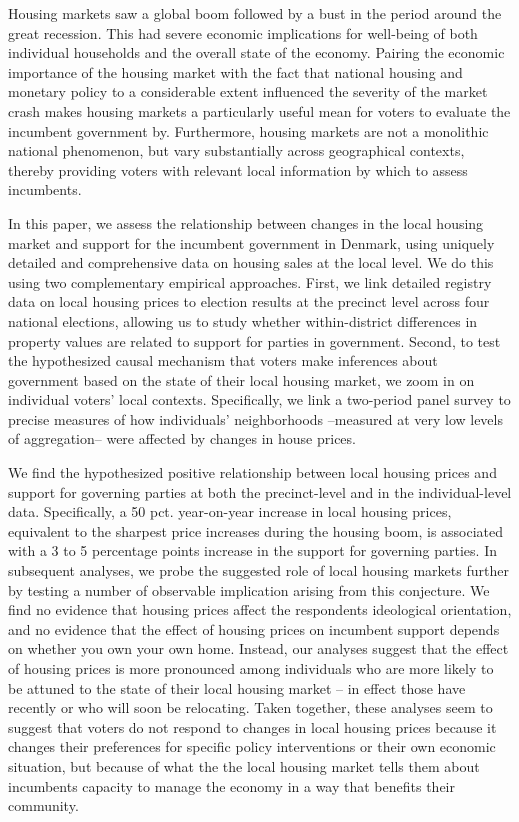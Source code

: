 \documentclass[12pt,a4paper]{article}
\begin{document}
Housing markets saw a global boom followed by a bust in the period around the great recession. This had severe economic implications for well-being of both individual households and the overall state of the economy. Pairing the economic importance of the housing market with the fact that national housing and monetary policy to a considerable extent influenced the severity of the market crash makes housing markets a particularly useful mean for voters to evaluate the incumbent government by. Furthermore, housing markets are not a monolithic national phenomenon, but vary substantially across geographical contexts, thereby providing voters with relevant local information by which to assess incumbents. 

In this paper, we assess the relationship between changes in the local housing market and support for the incumbent government in Denmark, using uniquely detailed and comprehensive data on housing sales at the local level. We do this using two complementary empirical approaches. First, we link detailed registry data on local housing prices to election results at the precinct level across four national elections, allowing us to study whether within-district differences in property values are related to support for parties in government. Second, to test the hypothesized causal mechanism that voters make inferences about government based on the state of their local housing market, we zoom in on individual voters' local contexts. Specifically, we link a two-period panel survey to precise measures of how individuals' neighborhoods --measured at very low levels of aggregation-- were affected by changes in house prices.

We find the hypothesized positive relationship between local housing prices and support for governing parties at both the precinct-level and in the individual-level data. Specifically, a 50 pct. year-on-year increase in local housing prices, equivalent to the sharpest price increases during the housing boom, is associated with a 3 to 5 percentage points increase in the support for governing parties. In subsequent analyses, we probe the suggested role of local housing markets further by testing a number of observable implication arising from this conjecture. We find no evidence that housing prices affect the respondents ideological orientation, and no evidence that the effect of housing prices on incumbent support depends on whether you own your own home. Instead, our analyses suggest that the effect of housing prices is more pronounced among individuals who are more likely to be attuned to the state of their local housing market -- in effect those have recently or who will soon be relocating. Taken together, these analyses seem to suggest that voters do not respond to changes in local housing prices because it changes their preferences for specific policy interventions or their own economic situation, but because of what the the local housing market tells them about incumbents capacity to manage the economy in a way that benefits their community.
\end{document}

